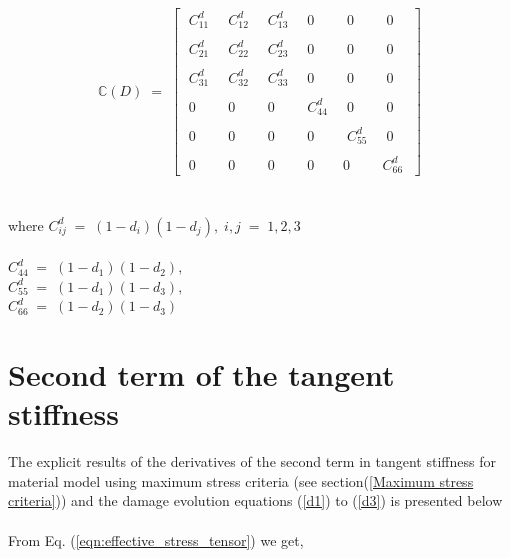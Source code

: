 \documentclass[12pt,a4paper,twoside,openright]{report}
\begin{document}
$$
\mathbb{C}(D) \; = \; 
\begin{bmatrix}
\;C_{11}^{d} \; & \; C_{12}^{d}\; & \;C_{13}^{d} \; & \;0 \; & \;0 \; &\; 0 \;\\
  \\
 \; C_{21}^{d}\; & \;C_{22}^{d}\;  &\; C_{23}^{d}\; & \;0\; &\; 0\; & \; 0 \;\\
 \\  
 \; C_{31}^{d}\; & \; C_{32}^{d}\; &\; C_{33}^{d}\;  & \;0 \;& \;0 \;& \;0 \;\\
  \\
 \; 0 \; & \; 0 \; & \; 0 \; & \; C_{44}^{d} \;  & \; 0\; &\; 0\; \\
  \\
  \; 0 \; & \; 0 \; & \; 0\; &\; 0\; &\; C_{55}^{d}\; &\; 0\; \\
  \\
 \; 0\; & \;0 \;& \; 0\; &\; 0 \;& 0 \;& C_{66}^{d}\;
 \end{bmatrix}
$$
\\
\\
where \; $C_{ij}^{d}\; = \; (1 - d_{i})(1 - d_{j}), \; i,j \; = \; 1,2,3 $ \\
\\
 $C_{44}^{d}\; = \; (1 - d_{1})(1 - d_{2}), $ \\
 $C_{55}^{d}\; = \; (1 - d_{1})(1 - d_{3}),  $ \\
 $C_{66}^{d}\; = \; (1 - d_{2})(1 - d_{3}) $ \\



\section{Second term of the tangent stiffness}
\indent\indent\indent The explicit results of the derivatives of the second term in tangent stiffness for material model using maximum stress criteria (see section(\ref{Maximum stress criteria})) and the damage evolution equations (\ref{d1}) to (\ref{d3}) is presented below\\\\
From Eq. (\ref{eqn:effective_stress_tensor}) we get,
\end{document}
